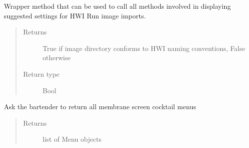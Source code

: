 \documentclass[letterpaper,10pt,english]{sphinxmanual}
\begin{document}
\begin{fulllineitems}
\begin{fulllineitems}
\label{\detokenize{polo.windows:polo.windows.run_importer_dialog.RunImporterDialog.handle_browse_request}}
\end{fulllineitems}


\begin{fulllineitems}
\label{\detokenize{polo.windows:polo.windows.run_importer_dialog.RunImporterDialog.handle_rar_file}}
\end{fulllineitems}


\begin{fulllineitems}
\label{\detokenize{polo.windows:polo.windows.run_importer_dialog.RunImporterDialog.make_hwi_run_suggestions}}
Wrapper method that can be used to call all methods involved in
displaying suggested settings for HWI Run image imports.
\begin{quote}\begin{description}
\item[{Returns}] \leavevmode
True if image directory conforms to HWI naming conventions, False otherwise

\item[{Return type}] \leavevmode
Bool

\end{description}\end{quote}

\end{fulllineitems}


\begin{fulllineitems}
\label{\detokenize{polo.windows:polo.windows.run_importer_dialog.RunImporterDialog.membrane_menus}}
Ask the bartender to return all membrane screen cocktail menus
\begin{quote}\begin{description}
\item[{Returns}] \leavevmode
list of Menu objects


\end{description}
\end{quote}
\end{fulllineitems}
\end{fulllineitems}
\end{document}
